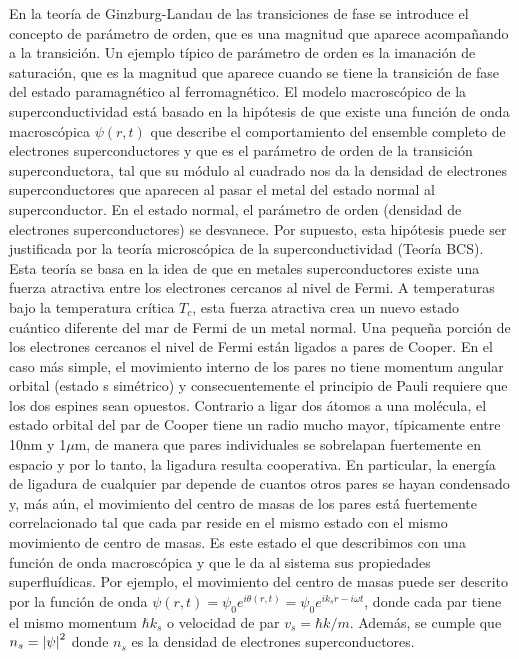 En la teoría de Ginzburg-Landau de las transiciones de fase se introduce el concepto de parámetro de orden, que es una magnitud que aparece acompañando a la transición. Un ejemplo típico de parámetro de orden es la imanación de saturación, que es la magnitud que aparece cuando se tiene la transición de fase del estado paramagnético al ferromagnético. El modelo macroscópico de la superconductividad está basado en la hipótesis de que existe una función de onda macroscópica $\psi(r,t)$ que describe el comportamiento del ensemble completo de electrones superconductores y que es el parámetro de orden de la transición superconductora, tal que su módulo al cuadrado nos da la densidad de electrones superconductores que aparecen al pasar el metal del estado normal al superconductor. En el estado normal, el parámetro de orden (densidad de electrones superconductores) se desvanece. Por supuesto, esta hipótesis puede ser justificada por la teoría microscópica de la superconductividad (Teoría BCS). Esta teoría se basa en la idea de que en metales superconductores existe una fuerza atractiva entre los electrones cercanos al nivel de Fermi. A temperaturas bajo la temperatura crítica $T_c$, esta fuerza atractiva crea un nuevo estado cuántico diferente del mar de Fermi de un metal normal. Una pequeña porción de los electrones cercanos el nivel de Fermi están ligados a pares de Cooper. En el caso más simple, el movimiento interno de los pares no tiene momentum angular orbital (estado s simétrico) y consecuentemente el principio de Pauli requiere que los dos espines sean opuestos. Contrario a ligar dos átomos a una molécula, el estado orbital del par de Cooper tiene un radio mucho mayor, típicamente entre 10nm y 1$\mu$m, de manera que pares individuales se sobrelapan fuertemente en espacio y por lo tanto, la ligadura resulta cooperativa. En particular, la energía de ligadura de cualquier par depende de cuantos otros pares se hayan condensado y, más aún, el movimiento del centro de masas de los pares está fuertemente correlacionado tal que cada par reside en el mismo estado con el mismo movimiento de centro de masas. Es este estado el que describimos con una función de onda macroscópica y que le da al sistema sus propiedades superfluídicas. Por ejemplo, el movimiento del centro de masas puede ser descrito por la función de onda $\psi(r,t) = \psi_0 e^{i \theta(r,t)} = \psi_0 e^{i k_s \dot r - i \omega t}$, donde cada par tiene el mismo momentum $\hbar k_s$ o velocidad de par $v_s = \hbar k/m$. Además, se cumple que $n_s = \abs{\psi}^2$ donde $n_s$ es la densidad de electrones superconductores.

